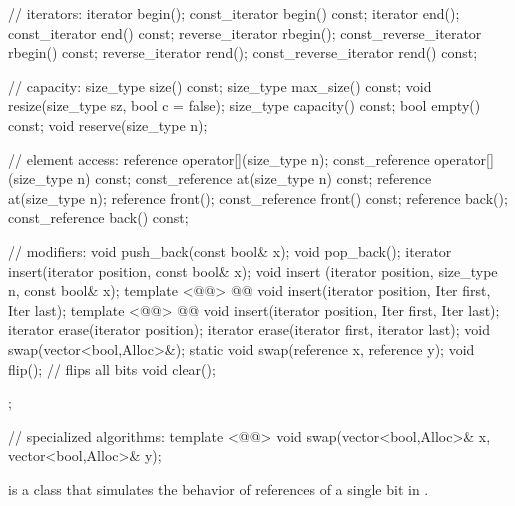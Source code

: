 \documentclass[american,twoside]{book}
\begin{document}
\begin{codeblock}
{{    // iterators:
    iterator               begin();
    const_iterator         begin() const;
    iterator               end();
    const_iterator         end() const;
    reverse_iterator       rbegin();
    const_reverse_iterator rbegin() const;
    reverse_iterator       rend();
    const_reverse_iterator rend() const;

    // capacity:
    size_type size() const;
    size_type max_size() const;
    void      resize(size_type sz, bool c = false);
    size_type capacity() const;
    bool      empty() const;
    void      reserve(size_type n);

    // element access:
    reference       operator[](size_type n);
    const_reference operator[](size_type n) const;
    const_reference at(size_type n) const;
    reference       at(size_type n);
    reference       front();
    const_reference front() const;
    reference       back();
    const_reference back() const;

    // modifiers:
    void push_back(const bool& x);
    void pop_back();
    iterator insert(iterator position, const bool& x);
    void     insert (iterator position, size_type n, const bool& x);
    template <@@>
      @@
        void insert(iterator position, Iter first, Iter last);
    template <@@>
      @@
        void insert(iterator position, Iter first, Iter last);
    iterator erase(iterator position);
    iterator erase(iterator first, iterator last);
    void swap(vector<bool,Alloc>&);
    static void swap(reference x, reference y);
    void flip();                // flips all bits
    void clear();
  };

  // specialized algorithms:
  template <@@>
    void swap(vector<bool,Alloc>& x, vector<bool,Alloc>& y);
}
\end{codeblock}%
%

\pnum
{}
is a class that simulates the behavior of references of a single bit in
.

\pnum
{}



\end{document}
